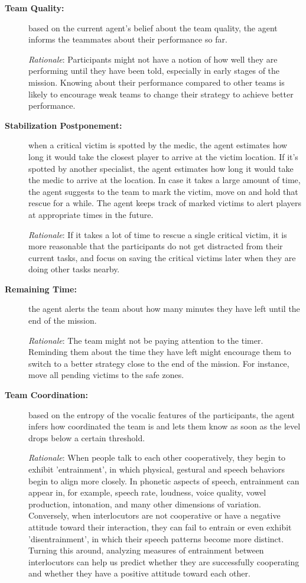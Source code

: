 \begin{description}
    \item[\textbf{Team Quality:}] based on the current agent's belief about the team quality, the agent informs the teammates about their performance so far.
        
    \emph{Rationale}: Participants might not have a notion of how well they are performing until they have been told, especially in early stages of the mission. Knowing about their performance compared to other teams is likely to encourage weak teams to change their strategy to achieve better performance. 
    
    \item[\textbf{Stabilization Postponement:}] when a critical victim is spotted by the medic, the agent estimates how long it would take the closest player to arrive at the victim location. If it’s spotted by another specialist, the agent estimates how long it would take the medic to arrive at the location. In case it takes a large amount of time, the agent suggests to the team to mark the victim, move on and hold that rescue for a while. The agent keeps track of marked victims to alert players at appropriate times in the future. 
        
    \emph{Rationale}: If it takes a lot of time to rescue a single critical victim, it is more reasonable that the participants do not get distracted from their current tasks, and focus on saving the critical victims later when they are doing other tasks nearby.
   
    \item[\textbf{Remaining Time:}] the agent alerts the team about how many minutes they have left until the end of the mission.
        
    \emph{Rationale}: The team might not be paying attention to the timer. Reminding them about the time they have left might encourage them to switch to a better strategy close to the end of the mission. For instance, move all pending victims to the safe zones.
    
    \item[\textbf{Team Coordination:}] based on the entropy of the vocalic features of the participants, the agent infers how coordinated the team is and lets them know as soon as the level drops below a certain threshold.  
        
    \emph{Rationale}: When people talk to each other cooperatively, they begin to exhibit 'entrainment', in which physical, gestural and speech behaviors begin to align more closely. In phonetic aspects of speech, entrainment can appear in, for example, speech rate, loudness, voice quality, vowel production, intonation, and many other dimensions of variation. Conversely, when interlocutors are not cooperative or have a negative attitude toward their interaction, they can fail to entrain or even exhibit 'disentrainment', in which their speech patterns become more distinct. Turning this around, analyzing measures of entrainment between interlocutors can help us predict whether they are successfully cooperating and whether they have a positive attitude toward each other.
\end{description}
    

